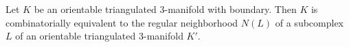 Let $K$ be an orientable triangulated 3-manifold with boundary. Then $K$ is combinatorially equivalent to the regular neighborhood $N(L)$ of a subcomplex $L$ of an orientable triangulated 3-manifold $K'$.

